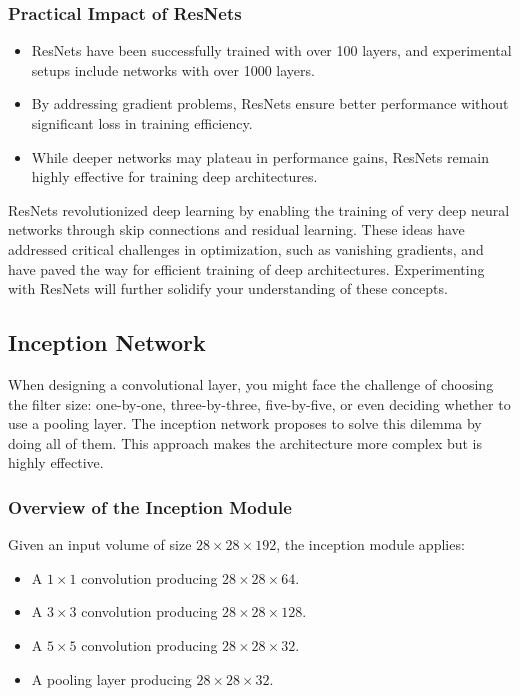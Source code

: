 \documentclass[letterpaper,12pt,notitlepage,twoside]{report}
\begin{document}
\subsubsection{Practical Impact of ResNets}
\begin{itemize}
    \item ResNets have been successfully trained with over 100 layers, and experimental setups include networks with over 1000 layers.
    \item By addressing gradient problems, ResNets ensure better performance without significant loss in training efficiency.
    \item While deeper networks may plateau in performance gains, ResNets remain highly effective for training deep architectures.
\end{itemize}

ResNets revolutionized deep learning by enabling the training of very deep neural networks through skip connections and residual learning. These ideas have addressed critical challenges in optimization, such as vanishing gradients, and have paved the way for efficient training of deep architectures. Experimenting with ResNets will further solidify your understanding of these concepts.

\subsection*{Inception Network}
When designing a convolutional layer, you might face the challenge of choosing the filter size: one-by-one, three-by-three, five-by-five, or even deciding whether to use a pooling layer. The inception network proposes to solve this dilemma by doing all of them. This approach makes the architecture more complex but is highly effective.

\subsubsection*{Overview of the Inception Module}
Given an input volume of size $28 \times 28 \times 192$, the inception module applies:

\begin{itemize}[nosep]
    \item A $1 \times 1$ convolution producing $28 \times 28 \times 64$.
    \item A $3 \times 3$ convolution producing $28 \times 28 \times 128$.
    \item A $5 \times 5$ convolution producing $28 \times 28 \times 32$.
    \item A pooling layer producing $28 \times 28 \times 32$.
\end{itemize}
\end{document}
